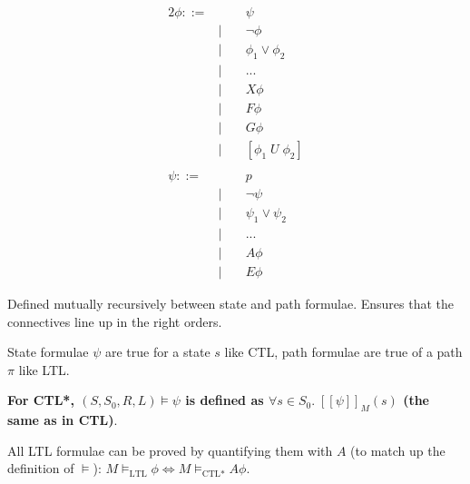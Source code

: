 \documentclass[a4paper, 11pt]{article}
\newcommand{\interp}[2][]{\mathcal{#1}[\![#2]\!]}
\begin{document}
{{        \begin{minipage}[t]{0.3\textwidth}
        \vspace{-8mm}
        \begin{alignat*}{2}
        \phi ::=& \; &\;& \psi \\
                & | && \neg \phi \tag*{Negation} \\
                & | && \phi_1 \vee \phi_2 \tag*{Disjunction} \\
                & | && ... \\\
                & | && X\phi \tag*{Successor} \\
                & | && F\phi \tag*{Sometimes} \\
                & | && G\phi \tag*{Always} \\
                & | && [\phi_1\;U\;\phi_2] \tag*{Until} \\
        \\
        \psi ::=& \; &\;& p \tag*{Atomic formula} \\
                & | && \neg \psi \tag*{Negation} \\
                & | && \psi_1 \vee \psi_2 \tag*{Disjunction} \\
                & | && ... \\
                & | && A\phi \tag*{All paths} \\
                & | && E\phi \tag*{Some paths}
        \end{alignat*}
        \end{minipage}
        \hspace{30mm}
        \begin{minipage}[t]{0.5\textwidth}
        \setlength{\parskip}{8pt}
        Defined mutually recursively between state and path formulae. Ensures that the connectives line up in the right orders.

        State formulae \(\psi\) are true for a state \(s\) like CTL, path formulae are true of a path \(\pi\) like LTL.

        \textbf{For CTL*, \((S,S_0,R,L) \vDash \psi\) is defined as \(\forall s \in S_0.\;\interp{\psi}_M(s)\) (the same as in CTL)}.

        All LTL formulae can be proved by quantifying them with \(A\) (to match up the definition of \(\vDash\)): \(M\vDash_\text{LTL}\phi \Longleftrightarrow M\vDash_\text{CTL*}A\phi\).
        \end{minipage}
    }
}
\end{document}
